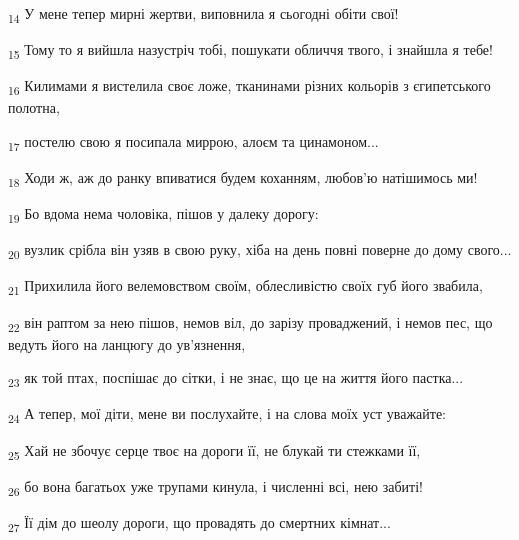 \begin{tcolorbox}
\textsubscript{14} У мене тепер мирні жертви, виповнила я сьогодні обіти свої!
\end{tcolorbox}
\begin{tcolorbox}
\textsubscript{15} Тому то я вийшла назустріч тобі, пошукати обличчя твого, і знайшла я тебе!
\end{tcolorbox}
\begin{tcolorbox}
\textsubscript{16} Килимами я вистелила своє ложе, тканинами різних кольорів з єгипетського полотна,
\end{tcolorbox}
\begin{tcolorbox}
\textsubscript{17} постелю свою я посипала миррою, алоєм та цинамоном...
\end{tcolorbox}
\begin{tcolorbox}
\textsubscript{18} Ходи ж, аж до ранку впиватися будем коханням, любов'ю натішимось ми!
\end{tcolorbox}
\begin{tcolorbox}
\textsubscript{19} Бо вдома нема чоловіка, пішов у далеку дорогу:
\end{tcolorbox}
\begin{tcolorbox}
\textsubscript{20} вузлик срібла він узяв в свою руку, хіба на день повні поверне до дому свого...
\end{tcolorbox}
\begin{tcolorbox}
\textsubscript{21} Прихилила його велемовством своїм, облесливістю своїх губ його звабила,
\end{tcolorbox}
\begin{tcolorbox}
\textsubscript{22} він раптом за нею пішов, немов віл, до зарізу проваджений, і немов пес, що ведуть його на ланцюгу до ув'язнення,
\end{tcolorbox}
\begin{tcolorbox}
\textsubscript{23} як той птах, поспішає до сітки, і не знає, що це на життя його пастка...
\end{tcolorbox}
\begin{tcolorbox}
\textsubscript{24} А тепер, мої діти, мене ви послухайте, і на слова моїх уст уважайте:
\end{tcolorbox}
\begin{tcolorbox}
\textsubscript{25} Хай не збочує серце твоє на дороги її, не блукай ти стежками її,
\end{tcolorbox}
\begin{tcolorbox}
\textsubscript{26} бо вона багатьох уже трупами кинула, і численні всі, нею забиті!
\end{tcolorbox}
\begin{tcolorbox}
\textsubscript{27} Її дім до шеолу дороги, що провадять до смертних кімнат...
\end{tcolorbox}
